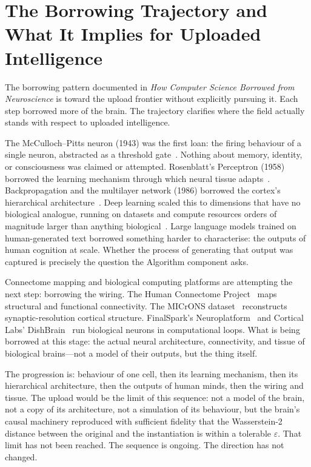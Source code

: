 \documentclass[12pt, a4paper]{article}
\begin{document}
\section{The Borrowing Trajectory and What It Implies for Uploaded Intelligence}

The borrowing pattern documented in \textit{How Computer Science Borrowed from Neuroscience} is
toward the upload frontier without explicitly pursuing it. Each step borrowed more of the brain. The
trajectory clarifies where the field actually stands with respect to uploaded intelligence.

The McCulloch--Pitts neuron (1943) was the first loan: the firing behaviour of a single neuron,
abstracted as a threshold gate~\cite{Bor-1}. Nothing about memory, identity, or consciousness was
claimed or attempted. Rosenblatt's Perceptron (1958) borrowed the learning mechanism through which
neural tissue adapts~\cite{Bor-2}. Backpropagation and the multilayer network (1986) borrowed the
cortex's hierarchical architecture~\cite{Bor-4}. Deep learning scaled this to dimensions that have
no biological analogue, running on datasets and compute resources orders of magnitude larger than
anything biological~\cite{Bor-5}. Large language models trained on human-generated text borrowed
something harder to characterise: the outputs of human cognition at scale. Whether the process of
generating that output was captured is precisely the question the Algorithm component asks.

Connectome mapping and biological computing platforms are attempting the next step: borrowing the
wiring. The Human Connectome Project~\cite{Bor-6} maps structural and functional connectivity. The
MICrONS dataset~\cite{Bio-4} reconstructs synaptic-resolution cortical structure. FinalSpark's
Neuroplatform~\cite{Bio-5} and Cortical Labs' DishBrain~\cite{Bio-6,Bor-9} run biological neurons
in computational loops. What is being borrowed at this stage: the actual neural architecture,
connectivity, and tissue of biological brains---not a model of their outputs, but the thing itself.

The progression is: behaviour of one cell, then its learning mechanism, then its hierarchical
architecture, then the outputs of human minds, then the wiring and tissue. The upload would be the
limit of this sequence: not a model of the brain, not a copy of its architecture, not a simulation of
its behaviour, but the brain's causal machinery reproduced with sufficient fidelity that the
Wasserstein-2 distance between the original and the instantiation is within a tolerable
$\varepsilon$. That limit has not been reached. The sequence is ongoing. The direction has not
changed.
\end{document}
